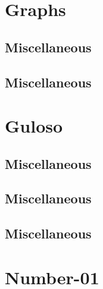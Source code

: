 \section{Graphs}
\subsection{Miscellaneous}
\raggedbottom
\vspace{-.7\baselineskip}\hrulefill
\vspace{0.1\baselineskip}\subsection{Miscellaneous}
\raggedbottom
\vspace{-.7\baselineskip}\hrulefill
\vspace{0.1\baselineskip}
\section{Guloso}
\subsection{Miscellaneous}
\raggedbottom
\vspace{-.7\baselineskip}\hrulefill
\vspace{0.1\baselineskip}\subsection{Miscellaneous}
\raggedbottom
\vspace{-.7\baselineskip}\hrulefill
\vspace{0.1\baselineskip}\subsection{Miscellaneous}
\raggedbottom
\vspace{-.7\baselineskip}\hrulefill
\vspace{0.1\baselineskip}
\section{Number-01}
